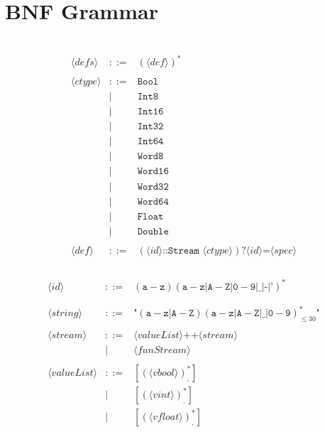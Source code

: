 \section{BNF Grammar}~\label{sec:BNF}
$$ \begin{array}{lcl}
\langle defs \rangle & ::= & (\langle def \rangle)^* \\
 & & \\
\langle ctype \rangle & ::= & \texttt{Bool} \\  
    & | & \texttt{Int8} \\
    & | & \texttt{Int16} \\ 
    & | & \texttt{Int32} \\
    & | & \texttt{Int64} \\
    & | & \texttt{Word8} \\ 
    & | & \texttt{Word16} \\
    & | & \texttt{Word32} \\
    & | & \texttt{Word64} \\
    & | & \texttt{Float} \\
    & | & \texttt{Double} \\
 & & \\
\langle def \rangle & ::= & (\langle id \rangle \texttt{::} \texttt{Stream } \langle ctype \rangle)? \langle id \rangle \texttt{=}\langle spec \rangle \\
\end{array} $$
\\
$$ \begin{array}{lcl}
\langle id \rangle & ::= & (\texttt{a}-\texttt{z})(\texttt{a}-\texttt{z}|\texttt{A}-\texttt{Z}|\texttt{0}-\texttt{9}|\_|\texttt{-}|\texttt{'})^* \\
 & & \\
 & & \\
\langle string \rangle & ::= & \texttt{"}(\texttt{a}-\texttt{z}|\texttt{A}-\texttt{Z})(\texttt{a}-\texttt{z}|\texttt{A}-\texttt{Z}|\texttt{\_}|\texttt{0}-\texttt{9})_{\leq 30}^*\texttt{"} \\
 & & \\
\langle stream \rangle & ::= & \langle valueList \rangle \texttt{++} \langle stream \rangle \\
    & | & \langle funStream \rangle \\ 
& & \\ 
\langle valueList \rangle & ::= & [(\langle vbool \rangle)_,^*] \\
    & | & [(\langle vint \rangle)_,^*] \\ 
    & | & [(\langle vfloat \rangle)_,^*] \\ 
 & & \\ 
\end{array} $$
